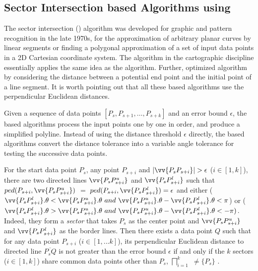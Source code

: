 \subsection{Sector Intersection based Algorithms using \ped}
\label{sub-ci-ped}





The sector intersection (\cia) algorithm \cite{Williams:Longest, Sklansky:Cone} was developed for graphic and pattern recognition in the late 1970s, for the approximation of arbitrary planar curves by linear segments or finding a polygonal approximation of a set of input data points in a 2D Cartesian coordinate system. The \sleeve algorithm \cite{Zhao:Sleeve} in the cartographic discipline essentially applies the same idea as the \cia algorithm.
Further, \cite{Dunham:Cone}  optimized algorithm \cia by considering the distance between a potential end point and the initial point of a line segment. It is worth pointing out that all these \cia based algorithms use the perpendicular Euclidean distances.


Given a sequence of data points $[P_{s}, P_{s+1}, \ldots, P_{s+k}]$ and an error bound $\epsilon$, the \cia based algorithms process the input points one by one in order, and produce a simplified polyline.  Instead of using the distance threshold $\epsilon$ directly, the \cia based algorithms convert the distance tolerance into a variable angle tolerance for testing the successive data points.

For the start data point $P_s$, any point $P_{s+i}$ and $|\vv{P_sP_{s+i}}|>\epsilon$ ($i\in[1, k]$), there are two directed lines $\vv{P_sP^u_{s+i}}$ and $\vv{P_sP^l_{s+i}}$ such that $ped(P_{s+i}, \vv{P_sP^u_{s+i}})$ $=$ $ped(P_{s+i}, \vv{P_sP^l_{s+i}}) = \epsilon$ and either ($\vv{P_sP^l_{s+i}}.\theta < \vv{P_sP^u_{s+i}}.\theta ~and~\vv{P_sP^u_{s+i}}.\theta - \vv{P_sP^l_{s+i}}.\theta <\pi$) or ($\vv{P_sP^l_{s+i}}.\theta > \vv{P_sP^u_{s+i}}.\theta ~and~ \vv{P_sP^u_{s+i}}.\theta - \vv{P_sP^l_{s+i}}.\theta < -\pi)$. Indeed, they form a \emph{sector}  that takes $P_s$ as the center point and $\vv{P_sP^u_{s+i}}$ and $\vv{P_sP^l_{s+i}}$ as the border lines.
Then there exists a data point $Q$ such that for any data point $P_{s+i}$ ($i \in [1, ... k]$), its perpendicular Euclidean distance to
directed line $\overline{P_sQ}$ is not greater than the error bound $\epsilon$ if and only if the $k$ sectors  ($i\in[1,k]$) share common data points other than $P_s$, \ie $\bigsqcap_{i=1}^{k}$ $\ne \{P_s\}$ \cite{Williams:Longest, Sklansky:Cone,Zhao:Sleeve}.

